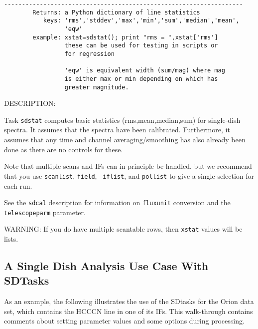 \begin{verbatim}
-------------------------------------------------------------------
        Returns: a Python dictionary of line statistics
           keys: 'rms','stddev','max','min','sum','median','mean',
                 'eqw'
        example: xstat=sdstat(); print "rms = ",xstat['rms']
                 these can be used for testing in scripts or
                 for regression

                 'eqw' is equivalent width (sum/mag) where mag
                 is either max or min depending on which has
                 greater magnitude.
\end{verbatim}
    DESCRIPTION:

     Task {\tt sdstat} computes basic statistics (rms,mean,median,sum)
     for single-dish spectra.  It assumes that the spectra have
     been calibrated.  Furthermore, it assumes that any
     time and channel averaging/smoothing has also already been done as
     there are no controls for these. 

     Note that multiple scans and IFs can in principle be handled, but
     we recommend that you use {\tt scanlist}, {\tt field}, {\tt
     iflist}, and {\tt pollist} to give a single selection for each run.

     See the {\tt sdcal} description for information on {\tt fluxunit} 
     conversion and the {\tt telescopeparm} parameter.

     WARNING: If you do have multiple scantable rows, then {\tt xstat}
     values will be lists.

\subsection{A Single Dish Analysis Use Case With SDTasks}
\label{section:sd.sdtasks.usecase}

As an example, the following illustrates the use of the SDtasks for
the Orion data set, which contains the HCCCN line in one of its IFs.
This walk-through contains comments about setting parameter values
and some options during processing.

